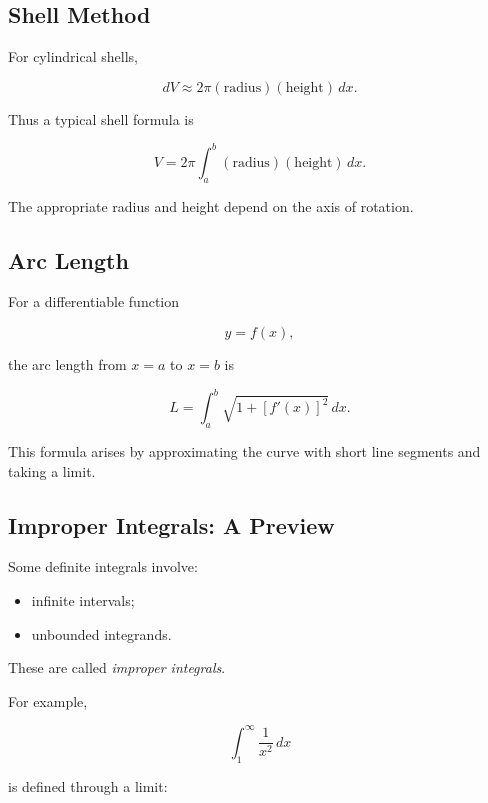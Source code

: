 \subsection{Shell Method}
\label{subsec:shell-method}

For cylindrical shells,

\[ dV\approx2\pi(\text{radius})(\text{height})\,dx. \]

Thus a typical shell formula is

\[ V=2\pi\int_a^b
(\text{radius})(\text{height})\,dx. \]

The appropriate radius and height depend on the axis of rotation.

\subsection{Arc Length}
\label{subsec:arc-length-single-variable}

For a differentiable function

\[ y=f(x), \]

the arc length from \(x=a\) to \(x=b\) is

\[ \boxed{
L=\int_a^b\sqrt{1+[f'(x)]^2}\,dx.
} \]

This formula arises by approximating the curve with short line segments and
taking a limit.

\subsection{Improper Integrals: A Preview}
\label{subsec:improper-integrals-preview}

Some definite integrals involve:

\begin{itemize}
    \item infinite intervals;
    \item unbounded integrands.
\end{itemize}

These are called \emph{improper integrals}.

For example,

\[ \int_1^\infty\frac1{x^2}\,dx \]

is defined through a limit:

